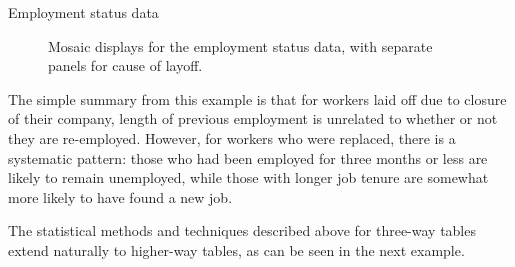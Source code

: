 \documentclass[11pt]{book}
\renewenvironment{knitrout}{\small\renewcommand{\baselinestretch}{.85}}{} %
\begin{document}
\begin{Example}[employ]{Employment status data}
\begin{knitrout}
\begin{figure}[!htbp]
\caption[Mosaic displays for the employment status data, with separate panels for cause of layoff]{Mosaic displays for the employment status data, with separate panels for cause of layoff.\label{fig:employ-mos3}}
\end{figure}


\end{knitrout}
The simple summary from this example is that for workers laid off due to closure of
their company, length of previous employment is unrelated to whether or not they 
are re-employed.  However, for workers who were replaced,
there is a systematic pattern:
those who had been employed for three months or less
are likely to remain unemployed, while those
with longer job tenure are somewhat more likely to have found a new job.
\end{Example}

The statistical methods and \R techniques described above for three-way tables
extend naturally to higher-way tables, as can be seen in the next example.
\end{document}
